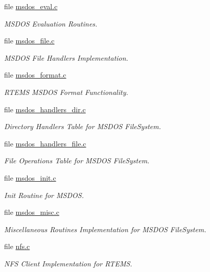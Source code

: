 \begin{DoxyCompactItemize}
file \mbox{\hyperlink{msdos__eval_8c}{msdos\+\_\+eval.\+c}}
\begin{DoxyCompactList}\small\item\em M\+S\+D\+OS Evaluation Routines. \end{DoxyCompactList}\item 
file \mbox{\hyperlink{msdos__file_8c}{msdos\+\_\+file.\+c}}
\begin{DoxyCompactList}\small\item\em M\+S\+D\+OS File Handlers Implementation. \end{DoxyCompactList}\item 
file \mbox{\hyperlink{msdos__format_8c}{msdos\+\_\+format.\+c}}
\begin{DoxyCompactList}\small\item\em R\+T\+E\+MS M\+S\+D\+OS Format Functionality. \end{DoxyCompactList}\item 
file \mbox{\hyperlink{msdos__handlers__dir_8c}{msdos\+\_\+handlers\+\_\+dir.\+c}}
\begin{DoxyCompactList}\small\item\em Directory Handlers Table for M\+S\+D\+OS File\+System. \end{DoxyCompactList}\item 
file \mbox{\hyperlink{msdos__handlers__file_8c}{msdos\+\_\+handlers\+\_\+file.\+c}}
\begin{DoxyCompactList}\small\item\em File Operations Table for M\+S\+D\+OS File\+System. \end{DoxyCompactList}\item 
file \mbox{\hyperlink{msdos__init_8c}{msdos\+\_\+init.\+c}}
\begin{DoxyCompactList}\small\item\em Init Routine for M\+S\+D\+OS. \end{DoxyCompactList}\item 
file \mbox{\hyperlink{msdos__misc_8c}{msdos\+\_\+misc.\+c}}
\begin{DoxyCompactList}\small\item\em Miscellaneous Routines Implementation for M\+S\+D\+OS File\+System. \end{DoxyCompactList}\item 
file \mbox{\hyperlink{nfs_8c}{nfs.\+c}}
\begin{DoxyCompactList}\small\item\em N\+FS Client Implementation for R\+T\+E\+MS. \end{DoxyCompactList}\item 

\end{DoxyCompactItemize}
